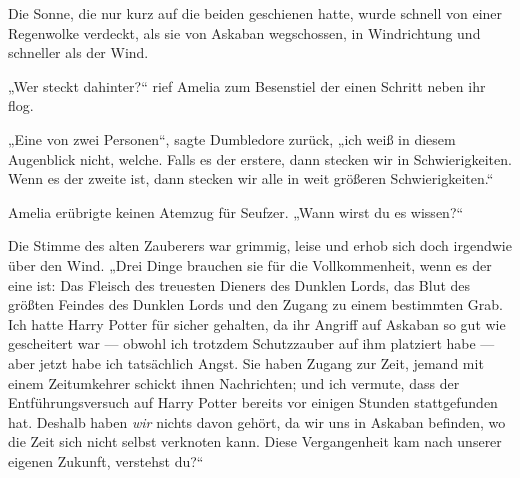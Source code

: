 \later

Die Sonne, die nur kurz auf die beiden geschienen hatte, wurde schnell von einer Regenwolke verdeckt, als sie von Askaban wegschossen, in Windrichtung und schneller als der Wind.

„Wer steckt dahinter?“ rief Amelia zum Besenstiel der einen Schritt neben ihr flog.

„Eine von zwei Personen“, sagte Dumbledore zurück, „ich weiß in diesem Augenblick nicht, welche. Falls es der erstere, dann stecken wir in Schwierigkeiten. Wenn es der zweite ist, dann stecken wir alle in weit größeren Schwierigkeiten.“

Amelia erübrigte keinen Atemzug für Seufzer.
„Wann wirst du es wissen?“

Die Stimme des alten Zauberers war grimmig, leise und erhob sich doch irgendwie über den Wind.
„Drei Dinge brauchen sie für die Vollkommenheit, wenn es der eine ist: Das Fleisch des treuesten Dieners des Dunklen Lords, das Blut des größten Feindes des Dunklen Lords und den Zugang zu einem bestimmten Grab. Ich hatte Harry Potter für sicher gehalten, da ihr Angriff auf Askaban so gut wie gescheitert war — obwohl ich trotzdem Schutzzauber auf ihm platziert habe — aber jetzt habe ich tatsächlich Angst. Sie haben Zugang zur Zeit, jemand mit einem Zeitumkehrer schickt ihnen Nachrichten; und ich vermute, dass der Entführungsversuch auf Harry Potter bereits vor einigen Stunden stattgefunden hat. Deshalb haben \emph{wir} nichts davon gehört, da wir uns in Askaban befinden, wo die Zeit sich nicht selbst verknoten kann. Diese Vergangenheit kam nach unserer eigenen Zukunft, verstehst du?“

